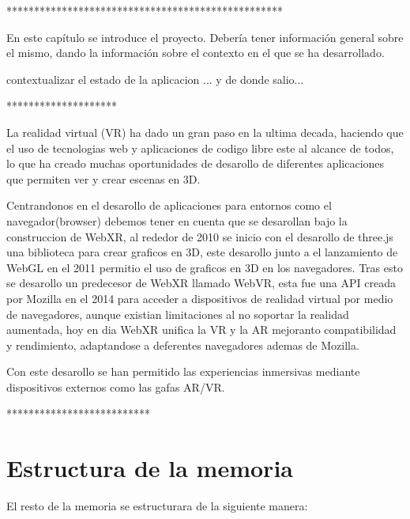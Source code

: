 \documentclass[a4paper, 12pt]{book}
\begin{document}
**************************************************

En este capítulo se introduce el proyecto.
Debería tener información general sobre el mismo, dando la información sobre el contexto en el que se ha desarrollado.

contextualizar el estado de la aplicacion ... y de donde salio...

********************

La realidad virtual (VR) ha dado un gran paso en la ultima decada, haciendo que el uso de tecnologias web y aplicaciones de codigo libre este al alcance de todos, lo que ha creado muchas oportunidades de desarollo de diferentes aplicaciones que permiten ver y crear escenas en 3D.

Centrandonos en el desarollo de aplicaciones para entornos como el navegador(browser) debemos tener en cuenta que se desarollan bajo la construccion de WebXR, al rededor de 2010 se inicio con el desarollo de three.js una biblioteca para crear graficos en 3D, este desarollo junto a el lanzamiento de WebGL en el 2011 permitio el uso de graficos en 3D en los navegadores. Tras esto se desarollo un predecesor de WebXR llamado WebVR, esta fue una API creada por Mozilla en el 2014 para acceder a dispositivos de realidad virtual por medio de navegadores, aunque existian limitaciones al no soportar la realidad aumentada, hoy en dia WebXR unifica la VR y la AR mejoranto compatibilidad y rendimiento, adaptandose a deferentes navegadores ademas de Mozilla.

Con este desarollo se han permitido las experiencias inmersivas mediante dispositivos externos como las gafas AR/VR.

**************************
\section{Estructura de la memoria}
\label{sec:estructura}

El resto de la memoria se estructurara de la siguiente manera:
\end{document}

